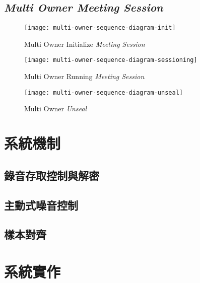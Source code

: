 \subsection{{\it Multi Owner Meeting Session}}

\begin{figure}[H]
    \centering
    \texttt{[image: multi-owner-sequence-diagram-init]}
    \caption{Multi Owner Initialize {\it Meeting Session}}
    \label{fig.m-o-init}
\end{figure}

\begin{figure}[H]
    \centering
    \texttt{[image: multi-owner-sequence-diagram-sessioning]}
    \caption{Multi Owner Running {\it Meeting Session}}
    \label{fig.m-o-sessioning}
\end{figure}

\begin{figure}[H]
    \centering
    \texttt{[image: multi-owner-sequence-diagram-unseal]}
    \caption{Multi Owner {\it Unseal}}
    \label{fig.m-o-unseal}
\end{figure}


\section{系統機制}

\subsection{錄音存取控制與解密}

\subsection{主動式噪音控制}

\subsection{樣本對齊}

\section{系統實作}